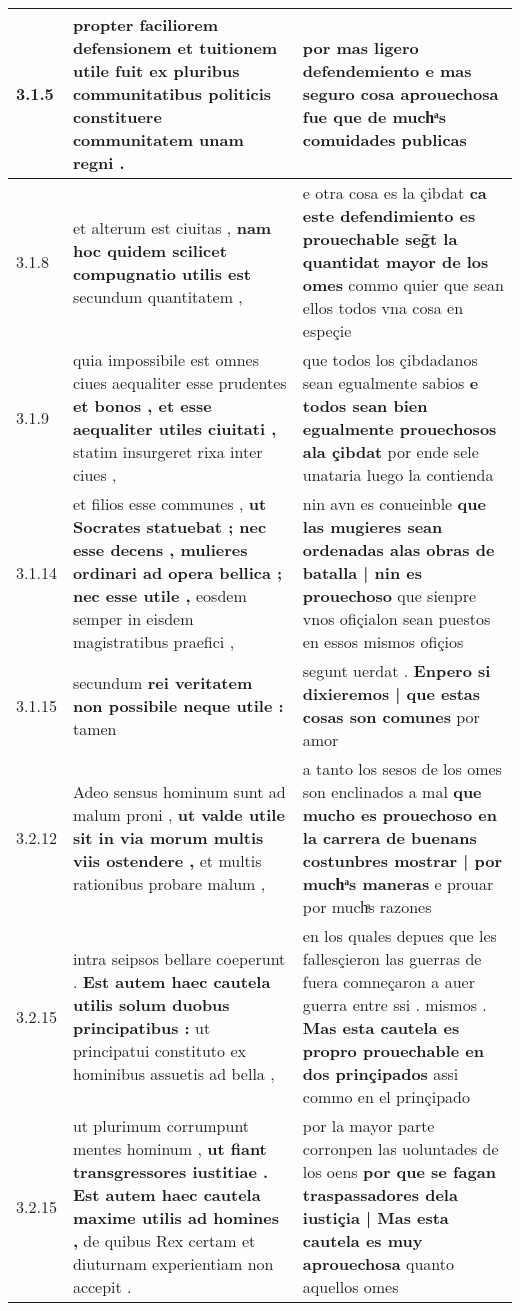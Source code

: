 \begin{tabular}{|p{1cm}|p{6.5cm}|p{6.5cm}|}
3.1.5 & propter faciliorem defensionem \textbf{ et tuitionem utile fuit } ex pluribus communitatibus politicis constituere communitatem unam regni . & por mas ligero defendemiento \textbf{ e mas seguro cosa aprouechosa fue } que de muchͣs comuidades publicas \\\hline
3.1.8 & et alterum est ciuitas , \textbf{ nam hoc quidem scilicet compugnatio utilis est } secundum quantitatem , & e otra cosa es la çibdat \textbf{ ca este defendimiento es prouechable seg̃t la quantidat mayor de los omes } commo quier que sean ellos todos vna cosa en espeçie \\\hline
3.1.9 & quia impossibile est omnes ciues aequaliter esse prudentes \textbf{ et bonos , et esse aequaliter utiles ciuitati , } statim insurgeret rixa inter ciues , & que todos los çibdadanos sean egualmente sabios \textbf{ e todos sean bien egualmente prouechosos ala çibdat } por ende sele unataria luego la contienda \\\hline
3.1.14 & et filios esse communes , \textbf{ ut Socrates statuebat ; nec esse decens , mulieres ordinari ad opera bellica ; nec esse utile , } eosdem semper in eisdem magistratibus praefici , & nin avn es conueinble \textbf{ que las mugieres sean ordenadas alas obras de batalla | nin es prouechoso } que sienpre vnos ofiçialon sean puestos en essos mismos ofiçios \\\hline
3.1.15 & secundum \textbf{ rei veritatem non possibile neque utile : } tamen & segunt uerdat . \textbf{ Enpero si dixieremos | que estas cosas son comunes } por amor \\\hline
3.2.12 & Adeo sensus hominum sunt ad malum proni , \textbf{ ut valde utile sit in via morum multis viis ostendere , } et multis rationibus probare malum , & a tanto los sesos de los omes son enclinados a mal \textbf{ que mucho es prouechoso en la carrera de buenans costunbres mostrar | por muchͣs maneras } e prouar por muchͣs razones \\\hline
3.2.15 & intra seipsos bellare coeperunt . \textbf{ Est autem haec cautela utilis solum duobus principatibus : } ut principatui constituto ex hominibus assuetis ad bella , & en los quales depues que les fallesçieron las guerras de fuera comneçaron a auer guerra entre ssi . mismos . \textbf{ Mas esta cautela es propro prouechable en dos prinçipados } assi commo en el prinçipado \\\hline
3.2.15 & ut plurimum corrumpunt mentes hominum , \textbf{ ut fiant transgressores iustitiae . Est autem haec cautela maxime utilis ad homines , } de quibus Rex certam et diuturnam experientiam non accepit . & por la mayor parte corronpen las uoluntades de los oens \textbf{ por que se fagan traspassadores dela iustiçia | Mas esta cautela es muy aprouechosa } quanto aquellos omes \\\hline

\end{tabular}
